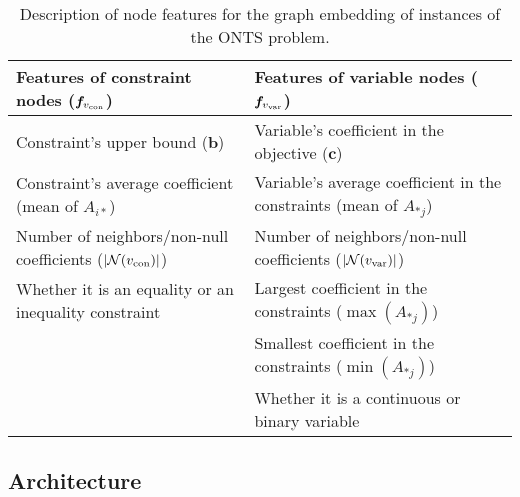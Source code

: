 \begin{table}[h]
    \centering
    \begin{tabular}{p{7cm}|p{7cm}}
    \toprule
        Features of constraint nodes ($\bm{f}_{v_{\rm con}}$) & Features of variable nodes ($\bm{f}_{v_{\rm var}}$) \\
    \midrule
	Constraint's upper bound ($\bm{b}$)                     &  Variable's coefficient in the objective ($\bm{c}$)\\[0.8cm]
         Constraint's average coefficient (mean of $A_{i*}$)     &  Variable's average coefficient in the constraints (mean of $A_{*j}$) \\[0.8cm]
         Number of neighbors/non-null coefficients ($|\mathcal{N}(v_{\rm con})|$)    &  Number of neighbors/non-null coefficients ($|\mathcal{N}(v_{\rm var})|$) \\[0.8cm]
         Whether it is an equality or an inequality constraint &  Largest coefficient in the constraints ($\max(A_{*j})$) \\[0.8cm]
                                                                    &  Smallest coefficient in the constraints ($\min(A_{*j})$) \\[0.8cm]
                                                                    &  Whether it is a continuous or binary variable \\
    \bottomrule
    \end{tabular}
    \caption{Description of node features for the graph embedding of instances of the ONTS problem.}
    \label{tab:feature-desc}
\end{table}

\subsection{Architecture}

